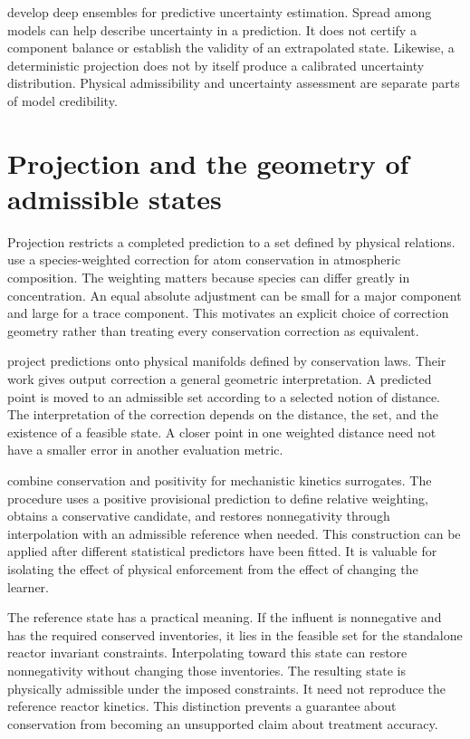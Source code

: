 \citet{Lakshminarayanan2017} develop deep ensembles for predictive uncertainty estimation. Spread among models can help describe uncertainty in a prediction. It does not certify a component balance or establish the validity of an extrapolated state. Likewise, a deterministic projection does not by itself produce a calibrated uncertainty distribution. Physical admissibility and uncertainty assessment are separate parts of model credibility.

\section{Projection and the geometry of admissible states}

Projection restricts a completed prediction to a set defined by physical relations. \citet{SturmSilva2024} use a species-weighted correction for atom conservation in atmospheric composition. The weighting matters because species can differ greatly in concentration. An equal absolute adjustment can be small for a major component and large for a trace component. This motivates an explicit choice of correction geometry rather than treating every conservation correction as equivalent.

\citet{Valente2025} project predictions onto physical manifolds defined by conservation laws. Their work gives output correction a general geometric interpretation. A predicted point is moved to an admissible set according to a selected notion of distance. The interpretation of the correction depends on the distance, the set, and the existence of a feasible state. A closer point in one weighted distance need not have a smaller error in another evaluation metric.

\citet{KircherVotsmeier2025} combine conservation and positivity for mechanistic kinetics surrogates. The procedure uses a positive provisional prediction to define relative weighting, obtains a conservative candidate, and restores nonnegativity through interpolation with an admissible reference when needed. This construction can be applied after different statistical predictors have been fitted. It is valuable for isolating the effect of physical enforcement from the effect of changing the learner.

The reference state has a practical meaning. If the influent is nonnegative and has the required conserved inventories, it lies in the feasible set for the standalone reactor invariant constraints. Interpolating toward this state can restore nonnegativity without changing those inventories. The resulting state is physically admissible under the imposed constraints. It need not reproduce the reference reactor kinetics. This distinction prevents a guarantee about conservation from becoming an unsupported claim about treatment accuracy.

